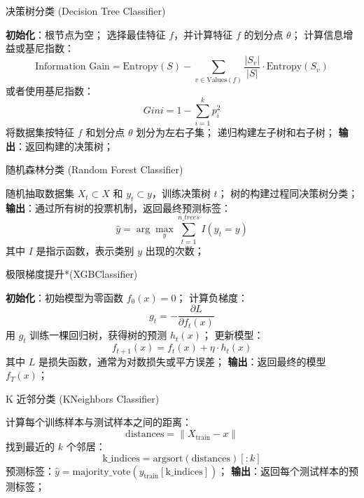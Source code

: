 \documentclass{article}
\begin{document}
\begin{algorithm}
\caption{决策树分类 (Decision Tree Classifier)}
\textbf{初始化}：根节点为空；
 {
    选择最佳特征 $f$，并计算特征 $f$ 的划分点 $\theta$；
    计算信息增益或基尼指数：
    \[
    \text{Information Gain} = \text{Entropy}(S) - \sum_{v \in \text{Values}(f)} \frac{|S_v|}{|S|} \cdot \text{Entropy}(S_v)
    \]
    或者使用基尼指数：
    \[
    Gini = 1 - \sum_{i=1}^k p_i^2
    \]
    将数据集按特征 $f$ 和划分点 $\theta$ 划分为左右子集；
    递归构建左子树和右子树；
}
\textbf{输出}：返回构建的决策树；
\end{algorithm}

\begin{algorithm}
\caption{随机森林分类 (Random Forest Classifier)}
 {
    随机抽取数据集 $X_t \subset X$ 和 $y_t \subset y$，训练决策树 $t$；
    树的构建过程同决策树分类；
}
\textbf{输出}：通过所有树的投票机制，返回最终预测标签：
\[
\hat{y} = \arg\max_{y} \sum_{t=1}^{n\_trees} I(y_t = y)
\]
其中 $I$ 是指示函数，表示类别 $y$ 出现的次数；
\end{algorithm}

\begin{algorithm}
\caption{极限梯度提升*(XGBClassifier)}
\textbf{初始化}：初始模型为零函数 $f_0(x) = 0$；
 {
    计算负梯度：
    \[
    g_t = -\frac{\partial L}{\partial f_t(x)}
    \]
    用 $g_t$ 训练一棵回归树，获得树的预测 $h_t(x)$；
    更新模型：
    \[
    f_{t+1}(x) = f_t(x) + \eta \cdot h_t(x)
    \]
    其中 $L$ 是损失函数，通常为对数损失或平方误差；
}
\textbf{输出}：返回最终的模型 $f_T(x)$；
\end{algorithm}

\begin{algorithm}
\caption{K 近邻分类 (KNeighbors Classifier)}
 {
    计算每个训练样本与测试样本之间的距离：
    \[
    \text{distances} = \|X_{\text{train}} - x\|
    \]
    找到最近的 $k$ 个邻居：
    \[
    \text{k\_indices} = \text{argsort}(\text{distances})[:k]
    \]
    预测标签：$\hat{y} = \text{majority\_vote}(y_{\text{train}}[\text{k\_indices}])$；
}
\textbf{输出}：返回每个测试样本的预测标签；
\end{algorithm}
\end{document}
